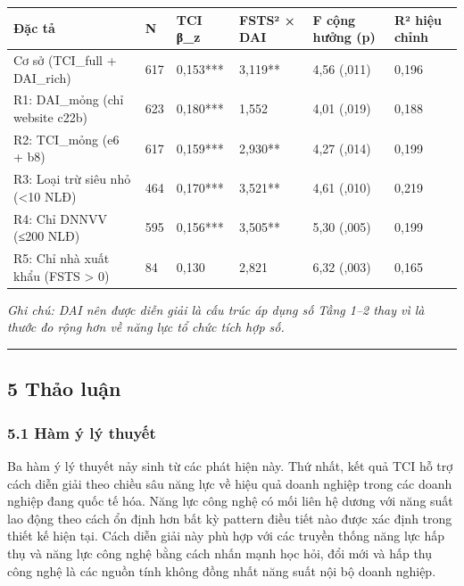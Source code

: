 \documentclass[12pt,a4paper]{article}
\begin{document}
\begin{longtable}[]{@{}llllll@{}}
\toprule\noalign{}
Đặc tả & N & TCI β\_z & FSTS² × DAI & F cộng hưởng (p) & R² hiệu
chỉnh \\
\midrule\noalign{}
\endhead
\bottomrule\noalign{}
\endlastfoot
Cơ sở (TCI\_full + DAI\_rich) & 617 & 0,153*** & 3,119** & 4,56 (,011) &
0,196 \\
R1: DAI\_mỏng (chỉ website c22b) & 623 & 0,180*** & 1,552 & 4,01 (,019)
& 0,188 \\
R2: TCI\_mỏng (e6 + b8) & 617 & 0,159*** & 2,930** & 4,27 (,014) &
0,199 \\
R3: Loại trừ siêu nhỏ (\textless10 NLĐ) & 464 & 0,170*** & 3,521** &
4,61 (,010) & 0,219 \\
R4: Chỉ DNNVV (≤200 NLĐ) & 595 & 0,156*** & 3,505** & 5,30 (,005) &
0,199 \\
R5: Chỉ nhà xuất khẩu (FSTS \textgreater{} 0) & 84 & 0,130 & 2,821 &
6,32 (,003) & 0,165 \\
\end{longtable}

\emph{Ghi chú: DAI nên được diễn giải là cấu trúc áp dụng số Tầng 1--2
thay vì là thước đo rộng hơn về năng lực tổ chức tích hợp số.}

\begin{center}\rule{0.5\linewidth}{0.5pt}\end{center}

\hypertarget{5-thux1ea3o-luux1eadn}{%
\subsection{5 Thảo luận}\label{5-thux1ea3o-luux1eadn}}

\hypertarget{51-huxe0m-uxfd-luxfd-thuyux1ebft}{%
\subsubsection{5.1 Hàm ý lý
thuyết}\label{51-huxe0m-uxfd-luxfd-thuyux1ebft}}

Ba hàm ý lý thuyết nảy sinh từ các phát hiện này. Thứ nhất, kết quả TCI
hỗ trợ cách diễn giải theo chiều sâu năng lực về hiệu quả doanh nghiệp
trong các doanh nghiệp đang quốc tế hóa. Năng lực công nghệ có mối liên
hệ dương với năng suất lao động theo cách ổn định hơn bất kỳ pattern
điều tiết nào được xác định trong thiết kế hiện tại. Cách diễn giải này
phù hợp với các truyền thống năng lực hấp thụ và năng lực công nghệ bằng
cách nhấn mạnh học hỏi, đổi mới và hấp thụ công nghệ là các nguồn tính
không đồng nhất năng suất nội bộ doanh nghiệp.
\end{document}
